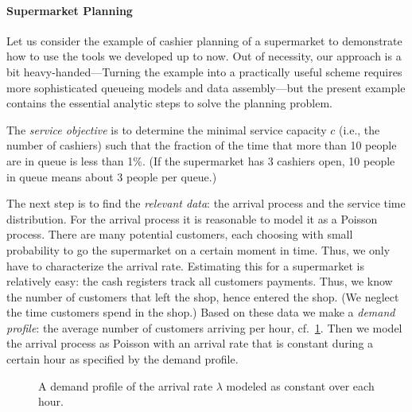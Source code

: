 \paragraph{Supermarket Planning}

Let us consider the example of cashier planning of a supermarket to
demonstrate how to use the tools we developed up to now. Out of
necessity, our approach is a bit heavy-handed---Turning the example
into a practically useful scheme requires more sophisticated queueing
models and data assembly---but the present example contains the
essential analytic steps to solve the planning problem.

The \emph{service objective} is to determine the minimal service
capacity $c$ (i.e., the number of cashiers) such that the fraction of the time that more than 
10 people are in queue is less than 1\%. (If the supermarket has 3 cashiers open, 10 people in queue  means about 3 people per queue.)

The next step is to find the \emph{relevant data}: the arrival process and the service time distribution. For the arrival process it is reasonable to model it as a Poisson process. There are many potential customers, each choosing with small probability to go the supermarket on a certain moment in time. Thus, we only have to  characterize the arrival rate. Estimating this for a supermarket  is relatively easy: the cash registers track all customers
payments. Thus, we know the number of customers that left the shop,
hence entered the shop. (We neglect the time customers spend in the
shop.) Based on these data we make a \emph{demand profile}: the
average number of customers arriving per hour, cf.~\cref{fig:loadprofile}. Then we model the arrival process as Poisson with an arrival rate that is constant during a certain hour as specified by the demand profile. 

\begin{figure}[t]
  \centering
{}
  \caption{A  demand profile of the arrival rate $\lambda$ modeled as constant over each hour.}
  \label{fig:loadprofile}
\end{figure}


